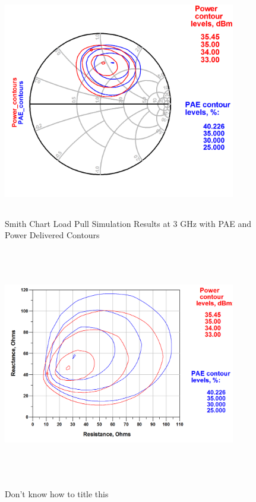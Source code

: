 \begin{figure}
  \centering
  \includegraphics[width=4in,height=4in,keepaspectratio]{figures/simulation/pae_pout_smith_cont_fund}\\
  \caption{Smith Chart Load Pull Simulation Results at 3 GHz with PAE and Power Delivered Contours}
  \label{fig:smith_fund_load}
  
  \vspace*{\floatsep}
  
  \centering
  \includegraphics[width=4in,height=4in,keepaspectratio]{figures/simulation/pae_pout_res_cont_fund}\\
  \caption{Don't know how to title this}
  \label{fig:xy_fund_load}
\end{figure}

